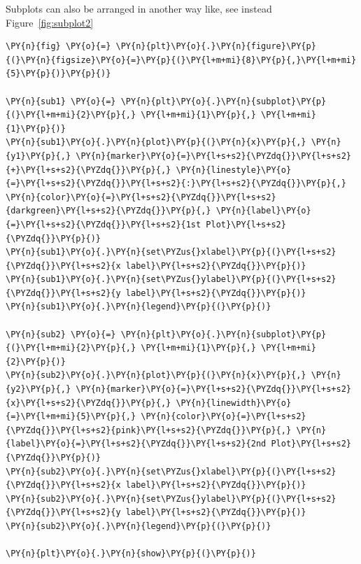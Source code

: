 Subplots can also be arranged in another way like, see instead Figure~\ref{fig:subplot2}

\begin{tcolorbox}[breakable, size=fbox, boxrule=1pt, pad at break*=1mm,colback=cellbackground, colframe=cellborder]
\begin{Verbatim}[commandchars=\\\{\}]
\PY{n}{fig} \PY{o}{=} \PY{n}{plt}\PY{o}{.}\PY{n}{figure}\PY{p}{(}\PY{n}{figsize}\PY{o}{=}\PY{p}{(}\PY{l+m+mi}{8}\PY{p}{,}\PY{l+m+mi}{5}\PY{p}{)}\PY{p}{)}
	
\PY{n}{sub1} \PY{o}{=} \PY{n}{plt}\PY{o}{.}\PY{n}{subplot}\PY{p}{(}\PY{l+m+mi}{2}\PY{p}{,} \PY{l+m+mi}{1}\PY{p}{,} \PY{l+m+mi}{1}\PY{p}{)}
\PY{n}{sub1}\PY{o}{.}\PY{n}{plot}\PY{p}{(}\PY{n}{x}\PY{p}{,} \PY{n}{y1}\PY{p}{,} \PY{n}{marker}\PY{o}{=}\PY{l+s+s2}{\PYZdq{}}\PY{l+s+s2}{+}\PY{l+s+s2}{\PYZdq{}}\PY{p}{,} \PY{n}{linestyle}\PY{o}{=}\PY{l+s+s2}{\PYZdq{}}\PY{l+s+s2}{:}\PY{l+s+s2}{\PYZdq{}}\PY{p}{,} \PY{n}{color}\PY{o}{=}\PY{l+s+s2}{\PYZdq{}}\PY{l+s+s2}{darkgreen}\PY{l+s+s2}{\PYZdq{}}\PY{p}{,} \PY{n}{label}\PY{o}{=}\PY{l+s+s2}{\PYZdq{}}\PY{l+s+s2}{1st Plot}\PY{l+s+s2}{\PYZdq{}}\PY{p}{)}
\PY{n}{sub1}\PY{o}{.}\PY{n}{set\PYZus{}xlabel}\PY{p}{(}\PY{l+s+s2}{\PYZdq{}}\PY{l+s+s2}{x label}\PY{l+s+s2}{\PYZdq{}}\PY{p}{)}
\PY{n}{sub1}\PY{o}{.}\PY{n}{set\PYZus{}ylabel}\PY{p}{(}\PY{l+s+s2}{\PYZdq{}}\PY{l+s+s2}{y label}\PY{l+s+s2}{\PYZdq{}}\PY{p}{)}
\PY{n}{sub1}\PY{o}{.}\PY{n}{legend}\PY{p}{(}\PY{p}{)}
	
\PY{n}{sub2} \PY{o}{=} \PY{n}{plt}\PY{o}{.}\PY{n}{subplot}\PY{p}{(}\PY{l+m+mi}{2}\PY{p}{,} \PY{l+m+mi}{1}\PY{p}{,} \PY{l+m+mi}{2}\PY{p}{)}
\PY{n}{sub2}\PY{o}{.}\PY{n}{plot}\PY{p}{(}\PY{n}{x}\PY{p}{,} \PY{n}{y2}\PY{p}{,} \PY{n}{marker}\PY{o}{=}\PY{l+s+s2}{\PYZdq{}}\PY{l+s+s2}{x}\PY{l+s+s2}{\PYZdq{}}\PY{p}{,} \PY{n}{linewidth}\PY{o}{=}\PY{l+m+mi}{5}\PY{p}{,} \PY{n}{color}\PY{o}{=}\PY{l+s+s2}{\PYZdq{}}\PY{l+s+s2}{pink}\PY{l+s+s2}{\PYZdq{}}\PY{p}{,} \PY{n}{label}\PY{o}{=}\PY{l+s+s2}{\PYZdq{}}\PY{l+s+s2}{2nd Plot}\PY{l+s+s2}{\PYZdq{}}\PY{p}{)}
\PY{n}{sub2}\PY{o}{.}\PY{n}{set\PYZus{}xlabel}\PY{p}{(}\PY{l+s+s2}{\PYZdq{}}\PY{l+s+s2}{x label}\PY{l+s+s2}{\PYZdq{}}\PY{p}{)}
\PY{n}{sub2}\PY{o}{.}\PY{n}{set\PYZus{}ylabel}\PY{p}{(}\PY{l+s+s2}{\PYZdq{}}\PY{l+s+s2}{y label}\PY{l+s+s2}{\PYZdq{}}\PY{p}{)}
\PY{n}{sub2}\PY{o}{.}\PY{n}{legend}\PY{p}{(}\PY{p}{)}
	
\PY{n}{plt}\PY{o}{.}\PY{n}{show}\PY{p}{(}\PY{p}{)}
\end{Verbatim}
\end{tcolorbox}

